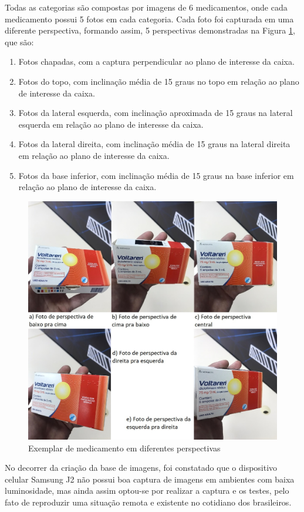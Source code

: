  Todas as categorias são compostas por imagens de 6 medicamentos, onde cada medicamento possui 5 fotos em cada categoria. Cada foto foi capturada em uma diferente perspectiva, formando assim, 5 perspectivas demonstradas na Figura \ref{perspectiva}, que são:
   \begin{enumerate}
   \item Fotos chapadas, com a captura perpendicular ao plano de interesse da caixa.
   \item Fotos do topo, com inclinação média de 15 graus no topo em relação ao plano de interesse da caixa.
    \item Fotos da lateral esquerda, com inclinação aproximada de 15 graus na lateral esquerda em relação ao plano de interesse da caixa.
    \item Fotos da lateral direita, com inclinação média de 15 graus na lateral direita em relação ao plano de interesse da caixa.
    \item Fotos da base inferior, com inclinação média de 15 graus na base inferior em relação ao plano de interesse da caixa.
 \end{enumerate}
  \begin{figure}[h!]
	\centering
	\includegraphics[height=0.70\textwidth]{Imagens/perspectiva.jpg} 
	\caption[Exemplar de medicamento em diferentes perspectivas.]{Exemplar de medicamento em diferentes perspectivas}
	\label{perspectiva}
\end{figure}
 
 
 No decorrer da criação da base de imagens, foi constatado que o dispositivo celular Samsung J2 
 não possui boa captura de imagens em ambientes com baixa luminosidade, mas ainda assim optou-se por realizar a captura e os testes, pelo fato de reproduzir uma situação remota e existente no cotidiano dos brasileiros.


